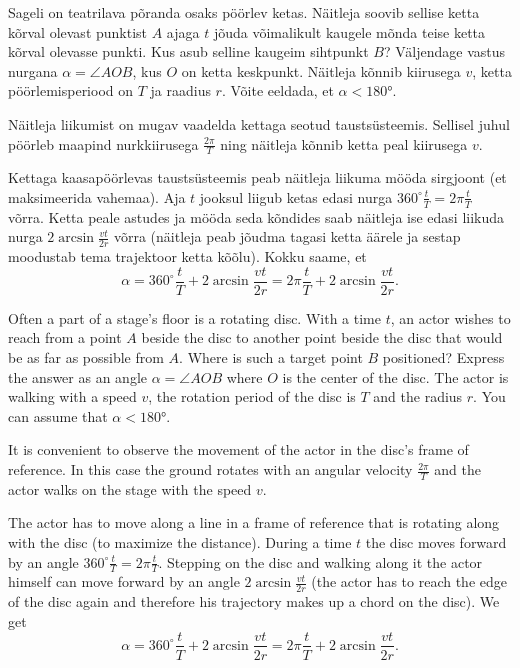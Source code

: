 
Sageli on teatrilava põranda osaks pöörlev ketas. Näitleja soovib sellise ketta
kõrval olevast punktist $A$ ajaga $t$ jõuda võimalikult kaugele mõnda teise ketta
kõrval olevasse punkti. Kus asub selline kaugeim sihtpunkt $B$? Väljendage vastus nurgana
$\alpha = \angle \mathit{AOB}$, kus $O$ on ketta keskpunkt. Näitleja kõnnib
kiirusega $v$, ketta pöörlemisperiood on $T$ ja raadius $r$. Võite eeldada, et $\alpha < \ang{180}$.

\hint
Näitleja liikumist on mugav vaadelda kettaga seotud taustsüsteemis. Sellisel juhul pöörleb maapind nurkkiirusega $\frac{2\pi}{T}$ ning näitleja kõnnib ketta peal kiirusega $v$.

\solu
Kettaga kaasapöörlevas taustsüsteemis peab näitleja liikuma mööda sirgjoont (et maksimeerida vahemaa).
Aja $t$ jooksul liigub ketas edasi nurga $360^\circ\frac{t}{T}=2\pi\frac{t}{T}$ võrra. Ketta peale astudes ja mööda seda kõndides saab näitleja ise edasi liikuda nurga $2\arcsin\frac{vt}{2r}$ võrra (näitleja peab jõudma tagasi ketta äärele ja sestap moodustab tema trajektoor ketta kõõlu). Kokku saame, et 
$$\alpha=360^\circ\frac{t}{T}+2\arcsin\frac{vt}{2r}=2\pi\frac{t}{T}+2\arcsin\frac{vt}{2r}.$$

Often a part of a stage’s floor is a rotating disc. With a time $t$, an actor wishes to reach from a point $A$ beside the disc to another point beside the disc that would be as far as possible from $A$.  Where is such a target point $B$ positioned? Express the answer as an angle $\alpha = \angle \mathit{AOB}$ where $O$ is the center of the disc. The actor is walking with a speed $v$, the rotation period of the disc is $T$ and the radius $r$. You can assume that $\alpha < \ang{180}$.

\hinteng
It is convenient to observe the movement of the actor in the disc’s frame of reference. In this case the ground rotates with an angular velocity $\frac{2\pi}{T}$ and the actor walks on the stage with the speed $v$.

\solueng
The actor has to move along a line in a frame of reference that is rotating along with the disc (to maximize the distance). During a time $t$ the disc moves forward by an angle $360^\circ\frac{t}{T}=2\pi\frac{t}{T}$. Stepping on the disc and walking along it the actor himself can move forward by an angle $2\arcsin\frac{vt}{2r}$ (the actor has to reach the edge of the disc again and therefore his trajectory makes up a chord on the disc). We get
$$\alpha=360^\circ\frac{t}{T}+2\arcsin\frac{vt}{2r}=2\pi\frac{t}{T}+2\arcsin\frac{vt}{2r}.$$
\probend